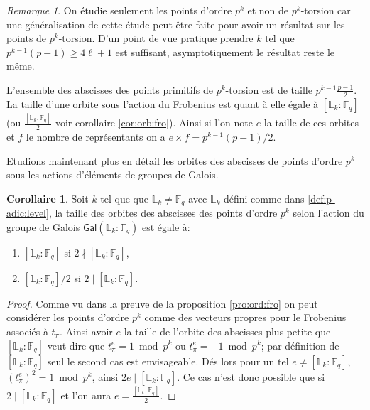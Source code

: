 \documentclass[10pt,a4paper]{book}
\theoremstyle{plain}
\theoremstyle{definition}
\theoremstyle{definition}
\theoremstyle{definition}
\newtheorem{cor}[thm]{Corollaire}
\theoremstyle{definition}
\theoremstyle{definition}
\theoremstyle{remark}
\newtheorem{rem}[thm]{Remarque}
\theoremstyle{remark}
\theoremstyle{definition}
\begin{document}
\begin{rem}
On étudie seulement les points d'ordre $p^k$ et non de $p^k$-torsion car une 
généralisation de cette étude peut être faite pour avoir un résultat sur les 
points de $p^k$-torsion. D'un point de vue pratique prendre $k$ tel que 
$p^{k-1}(p-1) \geqslant 4 \ell +1$ est suffisant, asymptotiquement le résultat 
reste le même.
\end{rem}

L'ensemble des abscisses des points primitifs de $p^k$-torsion est de taille 
$p^{k-1}\frac{p-1}{2}$. La taille d'une orbite sous l'action du Frobenius est 
quant à elle égale à $[\mathbb{L}_k:\mathbb{F}_q]$ (ou 
$\frac{[\mathbb{L}_k:\mathbb{F}_q]}{2}$ voir corollaire \ref{cor:orb:fro}). 
Ainsi si l'on note $e$ la taille de ces orbites et $f$ le nombre de 
représentants on a $e \times f=p^{k-1}(p-1)/2$.

Etudions maintenant plus en détail les orbites des abscisses de points d'ordre $p^k$ sous les actions d'éléments de groupes de Galois.

\begin{cor}
\label{cor:tai:orb}
Soit $k$ tel que que $\mathbb{L}_k \neq \mathbb{F}_q$ avec $\mathbb{L}_k$ défini comme dans \ref{def:p-adic:level}, 
la taille des orbites des abscisses des points d'ordre $p^k$ selon l'action du groupe de Galois $\mathsf{Gal}(\mathbb{L}_k:\mathbb{F}_q)$  est égale à:
\begin{enumerate} 
\item $[\mathbb{L}_k:\mathbb{F}_q]$ si $2 \nmid [\mathbb{L}_k:\mathbb{F}_q]$,
\item $[\mathbb{L}_k:\mathbb{F}_q]/2$ si $2 \mid [\mathbb{L}_k:\mathbb{F}_q]$.
\end{enumerate}
\end{cor}

\begin{proof}
Comme vu dans la preuve de la proposition \ref{pro:ord:fro} on peut considérer les points d'ordre $p^k$ comme des vecteurs propres pour le Frobenius associés à $t_{\pi}$. Ainsi avoir $e$ la taille de l'orbite des abscisses plus petite que  $[\mathbb{L}_k:\mathbb{F}_q]$ veut dire que $t_{\pi}^e=1 \bmod p^k$ ou $t_{\pi}^e=-1 \bmod p^k$; par définition de $[\mathbb{L}_k:\mathbb{F}_q]$ seul le second cas est envisageable. Dés lors pour un tel $e \neq [\mathbb{L}_k:\mathbb{F}_q]$,  $(t_{\pi}^{e})^2=1 \bmod p^k$, ainsi $2e \mid [\mathbb{L}_k:\mathbb{F}_q]$. Ce cas n'est donc possible que si $2 \mid [\mathbb{L}_k:\mathbb{F}_q]$ et l'on aura $e= \frac{[\mathbb{L}_k:\mathbb{F}_q]}{2}$. 
\end{proof}
\end{document}
